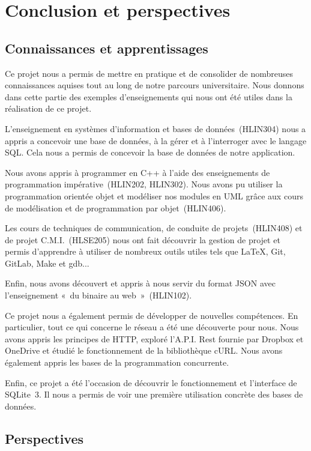 \chapter*{Conclusion et perspectives}

\section*{Connaissances et apprentissages}

Ce projet nous a permis de mettre en pratique et de consolider de nombreuses connaissances aquises tout au long de notre parcours universitaire. Nous donnons dans cette partie des exemples d'enseignements qui nous ont été utiles dans la réalisation de ce projet.

L'enseignement en systèmes d'information et bases de données~(HLIN304) nous a appris a concevoir une base de données, à la gérer et à l'interroger avec le langage SQL. Cela nous a permis de concevoir la base de données de notre application.

Nous avons appris à programmer en C++ à l'aide des enseignements de programmation impérative~(HLIN202, HLIN302). Nous avons pu utiliser la programmation orientée objet et modéliser nos modules en UML grâce aux cours de modélisation et de programmation par objet~(HLIN406).

Les cours de techniques de communication, de conduite de projets~(HLIN408) et de projet C.M.I.~(HLSE205) nous ont fait découvrir la gestion de projet et permis d'apprendre à utiliser de nombreux outils utiles tels que \LaTeX, Git, GitLab, Make et gdb...

Enfin, nous avons découvert et appris à nous servir du format JSON avec l'enseignement «~du binaire au web~»~(HLIN102).

Ce projet nous a également permis de développer de nouvelles compétences. En particulier, tout ce qui concerne le réseau a été une découverte pour nous. Nous avons appris les principes de HTTP, exploré l'A.P.I. Rest fournie par Dropbox et OneDrive et étudié le fonctionnement de la bibliothèque cURL. Nous avons également appris les bases de la programmation concurrente.

Enfin, ce projet a été l'occasion de découvrir le fonctionnement et l'interface de SQLite~3. Il nous a permis de voir une première utilisation concrète des bases de données.

\section*{Perspectives}

